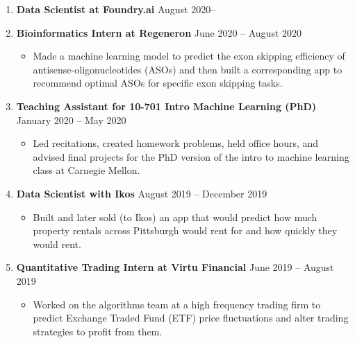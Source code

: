 \documentclass[letterpaper,11pt]{article}
\newcommand{\resitem}[1]{\item #1 \vspace{-2pt}}
\begin{document}
\vspace{-6pt}
\begin{enumerate}[leftmargin=10pt]
	\item[] \textbf{Data Scientist at \textcolor{myGreen}{Foundry.ai}} \cftdotfill{\cftdotsep} August 2020--\\

	\item[] \textbf{Bioinformatics Intern at \textcolor{myGreen}{Regeneron}} \cftdotfill{\cftdotsep} June 2020 -- August 2020\\
	\vspace{-4pt}	
	\begin{itemize}
		\resitem{Made a machine learning model to predict the exon skipping efficiency of antisense-oligonucleotides (ASOs) and then built a corresponding app to recommend optimal ASOs for specific exon skipping tasks.}	
	\end{itemize}

	\item[] \textbf{Teaching Assistant for \textcolor{myGreen}{10-701 Intro Machine Learning (PhD)}} \cftdotfill{\cftdotsep} January 2020 -- May 2020\\
	\vspace{-4pt}
	\begin{itemize}
		\resitem{Led recitations, created homework problems, held office hours, and advised final projects for the PhD version of the intro to machine learning class at Carnegie Mellon.}
	\end{itemize}

	\item[] \textbf{Data Scientist with \textcolor{myGreen}{Ikos}} \cftdotfill{\cftdotsep} August 2019 -- December 2019\\
	\vspace{-4pt}	
	\begin{itemize}
		\resitem{Built and later sold (to Ikos) an app that would predict how much property rentals across Pittsburgh would rent for and how quickly they would rent.}	
	\end{itemize}
	
	\item[] \textbf{Quantitative Trading Intern at \textcolor{myGreen}{Virtu Financial}} \cftdotfill{\cftdotsep} June 2019 -- August 2019\\
	\vspace{-4pt}
	\begin{itemize}
		\resitem{Worked on the algorithms team at a high frequency trading firm to predict Exchange Traded Fund (ETF) price fluctuations and alter trading strategies to profit from them.}
	\end{itemize}
\end{enumerate}
\end{document}
